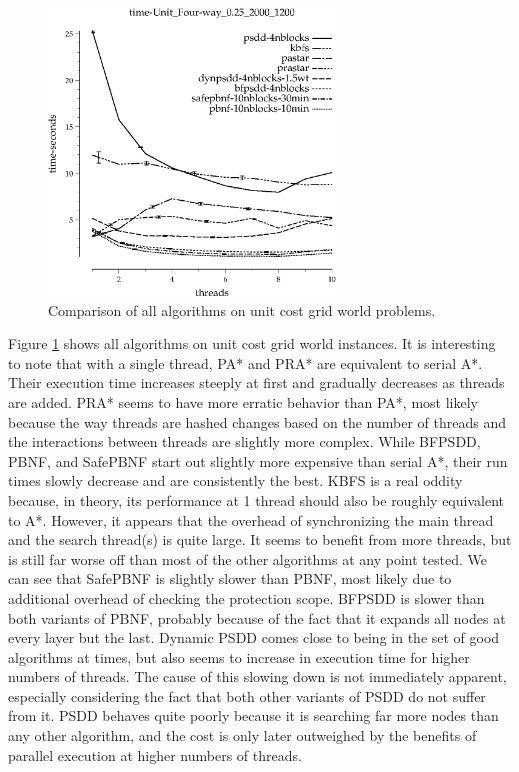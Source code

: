 \documentclass{article}
\begin{document}
\begin{figure}[h!]
\includegraphics[width=3in]{../graphs/seth/time-Unit_Four-way_0.25_2000_1200.eps}
\caption{Comparison of all algorithms on unit cost grid world problems.}
\label{fig:comp-grid}
\end{figure}

Figure \ref{fig:comp-grid} shows all algorithms on unit cost grid world instances. It is interesting to note that with a single thread, PA* and PRA* are equivalent to serial A*. Their execution time increases steeply at first and gradually decreases as threads are added. PRA* seems to have more erratic behavior than PA*, most likely because the way threads are hashed changes based on the number of threads and the interactions between threads are slightly more complex. While BFPSDD, PBNF, and SafePBNF start out slightly more expensive than serial A*, their run times slowly decrease and are consistently the best. KBFS is a real oddity because, in theory, its performance at 1 thread should also be roughly equivalent to A*. However, it appears that the overhead of synchronizing the main thread and the search thread(s) is quite large. It seems to benefit from more threads, but is still far worse off than most of the other algorithms at any point tested. We can see that SafePBNF is slightly slower than PBNF, most likely due to additional overhead of checking the protection scope. BFPSDD is slower than both variants of PBNF, probably because of the fact that it expands all nodes at every layer but the last. Dynamic PSDD comes close to being in the set of good algorithms at times, but also seems to increase in execution time for higher numbers of threads. The cause of this slowing down is not immediately apparent, especially considering the fact that both other variants of PSDD do not suffer from it. PSDD behaves quite poorly because it is searching far more nodes than any other algorithm, and the cost is only later outweighed by the benefits of parallel execution at higher numbers of threads.
\end{document}
